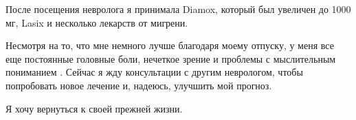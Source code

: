{После посещения невролога я принимала Diamox, который был увеличен до 1000 мг,
Lasix и несколько лекарств от мигрени.

Несмотря на то, что мне немного лучше благодаря моему отпуску, у меня все еще
постоянные головные боли, нечеткое зрение и проблемы с мыслительным пониманием
. Сейчас я жду консультации с другим неврологом, чтобы попробовать новое лечение
и, надеюсь, улучшить мой прогноз.

Я хочу вернуться к своей прежней жизни.

}
